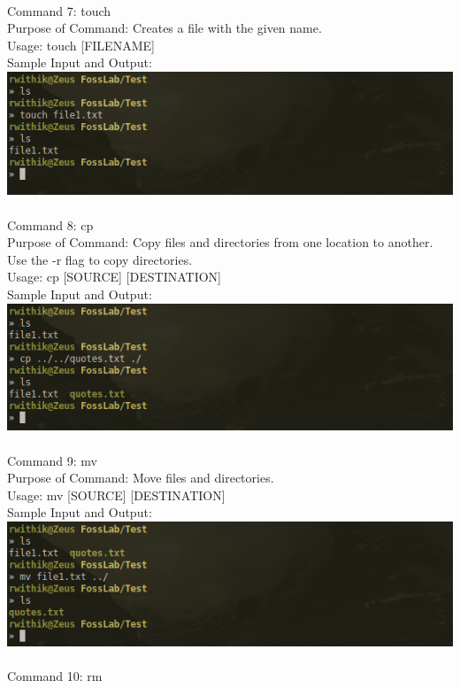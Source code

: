 \documentclass[10pt,a4paper]{report}
\begin{document}
\pagebreak
\\
Command 7: touch\\
Purpose of Command: Creates a file with the given name.\\
Usage: touch [FILENAME]\\
Sample Input and Output: \\
\includegraphics[scale=2]{touch.png}\\
\\
Command 8: cp\\
Purpose of Command: Copy files and directories from one location to another. Use the -r flag to copy directories.\\
Usage: cp [SOURCE] [DESTINATION]\\
Sample Input and Output: \\
\includegraphics[scale=2]{cp.png}\\
\\
Command 9: mv\\
Purpose of Command: Move files and directories.\\
Usage: mv [SOURCE] [DESTINATION]\\
Sample Input and Output: \\
\includegraphics[scale=2]{mv.png}\\
\pagebreak
\\
Command 10: rm\\
\end{document}
